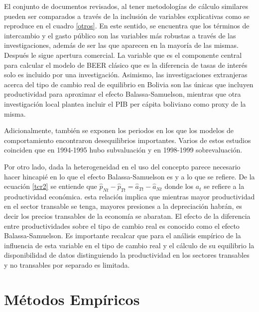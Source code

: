 \documentclass[12pt,letterpaper]{article}
\begin{document}

El conjunto de documentos revisados, al tener metodologías de cálculo similares pueden ser comparados a través de la inclusión de variables explicativas como se reproduce en el cuadro \ref{otros}. En este sentido, se encuentra que los términos de intercambio y el gasto público son las variables más robustas a través de las investigaciones, además de ser las que aparecen en la mayoría de las mismas. Después le sigue apertura comercial. La variable que es el componente central para calcular el modelo de BEER clásico que es la diferencia de tasas de interés solo es incluido por una investigación. Asimismo, las investigaciones extranjeras acerca del tipo de cambio real de equilibrio en Bolivia son las únicas que incluyen productividad para aproximar el efecto Balassa-Samuelson, mientras que otra investigación local plantea incluir el PIB per cápita boliviano como proxy de la misma.

Adicionalmente, también se exponen los periodos en los que los modelos de comportamiento encontraron desequilibrios importantes. Varios de estos estudios coinciden que en 1994-1995 hubo subvaluación y en 1998-1999 sobrevaluación. 

Por otro lado, dada la heterogeneidad en el uso del concepto parece necesario hacer hincapié en lo que el efecto Balassa-Samuelson es y a lo que se refiere. De la ecuación \ref{tcr2} se entiende que $\hat{p}_{Nt}-\hat{p}_{Tt}=\hat{a}_{Tt}-\hat{a}_{Nt}$ donde los $a_t$ se refiere a la productividad económica. esta relación implica que mientras mayor productividad en el sector transable se tenga, mayores presiones a la depreciación habrán, es decir los precios transables de la economía se abaratan. El efecto de la diferencia entre productividades sobre el tipo de cambio real es conocido como el efecto Balassa-Samuelson. Es importante recalcar que para el análisis empírico de la influencia de esta variable en el tipo de cambio real y el cálculo de su equilibrio la disponibilidad de datos distinguiendo la productividad en los sectores transables y no transables por separado es limitada. 


\section{Métodos Empíricos}\label{tcr}
\end{document}
